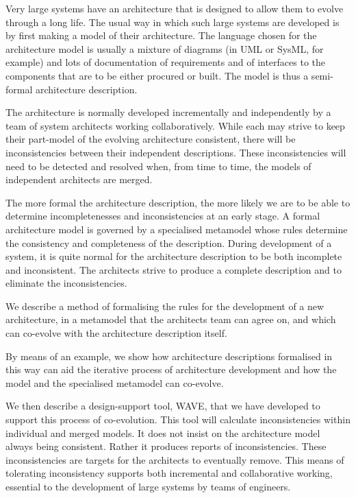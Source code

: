 \documentclass[times, 10pt,twocolumn]{article}
\begin{document}

\noindent Very large systems have an architecture that is designed to allow them to evolve through a long life. The usual way in which such large systems are developed is by first making a model of their architecture. The language chosen for the architecture model is usually a mixture of diagrams (in UML or SysML, for example) and lots of documentation of requirements and of interfaces to the components that are to be either procured or built. The model is thus a semi-formal architecture description. 

The architecture is normally developed incrementally and independently by a team of system architects working collaboratively. While each may strive to keep their part-model of the evolving architecture consistent, there will be inconsistencies between their independent descriptions. These inconsistencies will need to be detected and resolved when, from time to time, the models of independent architects are merged.

The more formal the architecture description, the more likely we are to be able to determine incompletenesses and inconsistencies at an early stage. A formal architecture model is governed by a specialised metamodel whose rules determine the consistency and completeness of the description. During development of  a system, it is quite normal for the architecture  description to be both incomplete and inconsistent.  The architects strive to produce a complete  description and to eliminate the inconsistencies. 

We describe a method of formalising the rules for the development of a new architecture, in a metamodel that the architects team can agree on, and which can co-evolve with the architecture description itself. 

By  means of an example, we show how architecture descriptions formalised in this way can aid the iterative process of architecture development and how the  model and the specialised metamodel can co-evolve. 

We then describe a design-support tool, WAVE, that we have developed to support this  process of co-evolution. This tool will calculate inconsistencies within individual and merged models. It does not insist on the architecture model always being consistent. Rather it produces reports of inconsistencies. These inconsistencies are targets for the architects to eventually remove. This means of tolerating inconsistency supports both incremental and collaborative working, essential to the development of large systems by teams of engineers.
\end{document}
